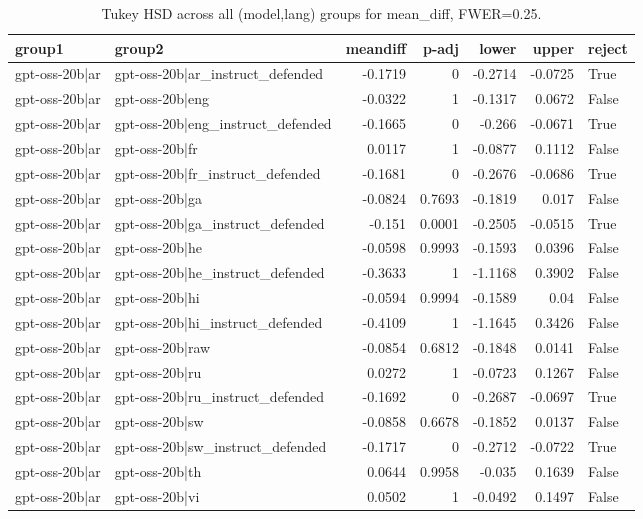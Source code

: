 \begin{table}
\caption{Tukey HSD across all (model,lang) groups for mean_diff, FWER=0.25.}
\label{tab:tukey_all_models_all_langs_mean_diff}
\begin{tabular}{l l r r r r l}
\toprule
group1 & group2 & meandiff & p-adj & lower & upper & reject \\
\midrule
gpt-oss-20b|ar & gpt-oss-20b|ar_instruct_defended & -0.1719 & 0 & -0.2714 & -0.0725 & True \\
gpt-oss-20b|ar & gpt-oss-20b|eng & -0.0322 & 1 & -0.1317 & 0.0672 & False \\
gpt-oss-20b|ar & gpt-oss-20b|eng_instruct_defended & -0.1665 & 0 & -0.266 & -0.0671 & True \\
gpt-oss-20b|ar & gpt-oss-20b|fr & 0.0117 & 1 & -0.0877 & 0.1112 & False \\
gpt-oss-20b|ar & gpt-oss-20b|fr_instruct_defended & -0.1681 & 0 & -0.2676 & -0.0686 & True \\
gpt-oss-20b|ar & gpt-oss-20b|ga & -0.0824 & 0.7693 & -0.1819 & 0.017 & False \\
gpt-oss-20b|ar & gpt-oss-20b|ga_instruct_defended & -0.151 & 0.0001 & -0.2505 & -0.0515 & True \\
gpt-oss-20b|ar & gpt-oss-20b|he & -0.0598 & 0.9993 & -0.1593 & 0.0396 & False \\
gpt-oss-20b|ar & gpt-oss-20b|he_instruct_defended & -0.3633 & 1 & -1.1168 & 0.3902 & False \\
gpt-oss-20b|ar & gpt-oss-20b|hi & -0.0594 & 0.9994 & -0.1589 & 0.04 & False \\
gpt-oss-20b|ar & gpt-oss-20b|hi_instruct_defended & -0.4109 & 1 & -1.1645 & 0.3426 & False \\
gpt-oss-20b|ar & gpt-oss-20b|raw & -0.0854 & 0.6812 & -0.1848 & 0.0141 & False \\
gpt-oss-20b|ar & gpt-oss-20b|ru & 0.0272 & 1 & -0.0723 & 0.1267 & False \\
gpt-oss-20b|ar & gpt-oss-20b|ru_instruct_defended & -0.1692 & 0 & -0.2687 & -0.0697 & True \\
gpt-oss-20b|ar & gpt-oss-20b|sw & -0.0858 & 0.6678 & -0.1852 & 0.0137 & False \\
gpt-oss-20b|ar & gpt-oss-20b|sw_instruct_defended & -0.1717 & 0 & -0.2712 & -0.0722 & True \\
gpt-oss-20b|ar & gpt-oss-20b|th & 0.0644 & 0.9958 & -0.035 & 0.1639 & False \\
gpt-oss-20b|ar & gpt-oss-20b|vi & 0.0502 & 1 & -0.0492 & 0.1497 & False \\

\end{tabular}
\end{table}
